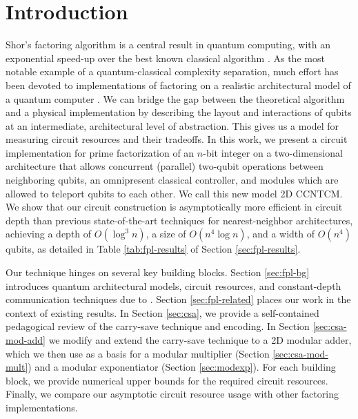 \section{Introduction}
\label{sec:fpl-intro}

Shor's factoring algorithm is a central result in quantum computing, with an
exponential speed-up over the best known classical algorithm \cite{Shor1994}.
As the most notable example of a quantum-classical complexity separation, much
effort has been devoted to implementations of factoring on a
realistic architectural model of a quantum computer
\cite{Beauregard2002,Kutin2006,VanMeter2006,VanMeter2005,VanMeterIL2005}.
We can bridge the gap between
the theoretical algorithm and a physical implementation by describing
the layout and interactions of qubits at an intermediate,
architectural level of abstraction.
This gives us a model for measuring circuit resources and their tradeoffs.
In this work, we present a circuit implementation for prime
factorization of an $n$-bit integer
on a two-dimensional architecture that allows concurrent (parallel) two-qubit operations
between neighboring qubits, an omnipresent classical controller, and
modules which are allowed to teleport qubits to each other. We call this new
model \textsf{2D CCNTCM}.
We show that our circuit construction is asymptotically more efficient in circuit depth than previous state-of-the-art techniques for nearest-neighbor
architectures, achieving a depth of $O(\log^3 n)$, a size of
$O(n^4\log n)$, and a width of $O(n^4)$ qubits, as detailed in Table
\ref{tab:fpl-results} of Section \ref{sec:fpl-results}.

Our technique hinges on several key building blocks.
Section \ref{sec:fpl-bg} introduces quantum architectural models, circuit
resources, and constant-depth communication techniques due to
\cite{Harrow2012,Rosenbaum2012}.
Section \ref{sec:fpl-related} places our work in the context of existing
results.
In Section \ref{sec:csa}, we provide a self-contained pedagogical review
of the carry-save technique and encoding.
In Section \ref{sec:csa-mod-add} we modify and extend the carry-save technique to a 2D
modular adder,
which we then use as a basis for a modular multiplier
(Section \ref{sec:csa-mod-mult}) and a modular exponentiator
(Section \ref{sec:modexp}).
For each building block, we provide numerical upper bounds for the
required circuit resources.
Finally, we compare our asymptotic circuit resource usage
with other factoring implementations.
